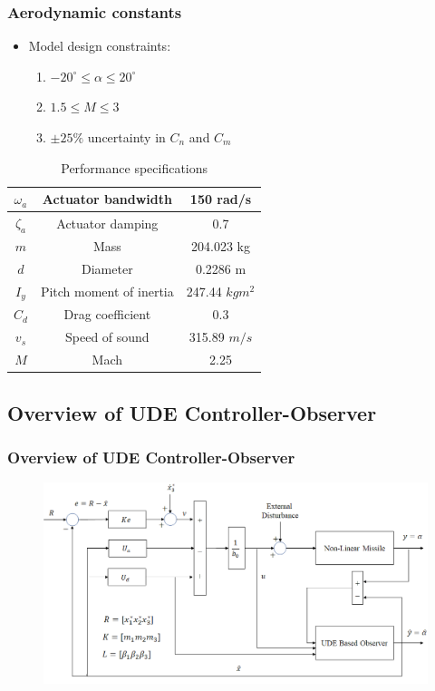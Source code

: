 \documentclass[table,10pt,red]{beamer}	%
\begin{document}
 	
 	\begin{frame}
 	\frametitle{Aerodynamic constants}
 	\begin{itemize}
 		\item Model design constraints:
 		\begin{enumerate}
 			\item $-20^\circ\le \alpha \le20^\circ$
 			\item $1.5 \le M \le 3$
 			\item $\pm25\%$ uncertainty in $C_n$ and $C_m$
 		\end{enumerate}
 	\end{itemize}
 	\begin{table}[h]
 		\begin{center}
 			\caption{Performance specifications}\label{tb1}
 			\begin{tabular}{ccc}
 				\hline
 				$\omega_a$ & Actuator bandwidth & 150 rad/s\\ \hline
 				$\zeta_a$ & Actuator damping & 0.7 \\ \hline
 				$m$ & Mass & 204.023 kg\\ \hline
 				$d$ & Diameter & 0.2286 m \\ \hline
 				$I_y$ & Pitch moment of inertia & 247.44 $kgm^2$\\ \hline
 				$C_d$ & Drag coefficient & 0.3\\ \hline
  				$v_s$ & Speed of sound & 315.89 $m/s$ \\ \hline
 				$M$ & Mach & 2.25 \\ \hline
 			\end{tabular}
 		\end{center}
 	\end{table}
 \end{frame}

\subsection{Overview of UDE Controller-Observer} 	
\begin{frame}
	\frametitle{Overview of UDE Controller-Observer}
		\begin{figure}
			\includegraphics[width=0.8\linewidth]{block_diag}
		\end{figure}

\end{frame}
\end{document}
